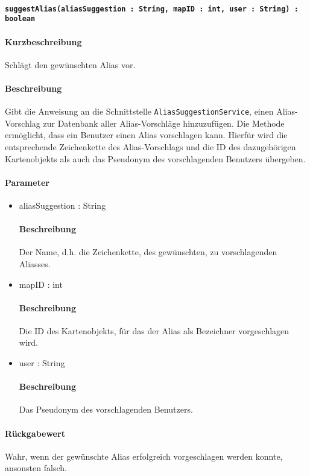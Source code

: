\paragraph{\texttt{suggestAlias(aliasSuggestion : String, mapID : int, user : String) : boolean}}%
\paragraph*{Kurzbeschreibung}
Schlägt den gewünschten Alias vor.
\paragraph*{Beschreibung}
Gibt die Anweisung an die Schnittstelle \texttt{AliasSuggestionService}, einen Alias-Vorschlag zur Datenbank aller Alias-Vorschläge hinzuzufügen.
Die Methode ermöglicht, dass ein Benutzer einen Alias vorschlagen kann. 
Hierfür wird die entsprechende Zeichenkette des Alias-Vorschlags und die ID des dazugehörigen Kartenobjekts als auch das Pseudonym des vorschlagenden Benutzers übergeben.
\paragraph*{Parameter}
\begin{itemize}
	\item aliasSuggestion : String
		\paragraph*{Beschreibung}
		Der Name, d.h. die Zeichenkette, des gewünschten, zu vorschlagenden Aliasses.
	\item mapID : int
		\paragraph*{Beschreibung}
		Die ID des Kartenobjekts, für das der Alias als Bezeichner vorgeschlagen wird.
	\item user : String
		\paragraph*{Beschreibung}
		Das Pseudonym des vorschlagenden Benutzers.
\end{itemize}
\paragraph*{Rückgabewert}
Wahr, wenn der gewünschte Alias erfolgreich vorgeschlagen werden konnte, ansonsten falsch.
